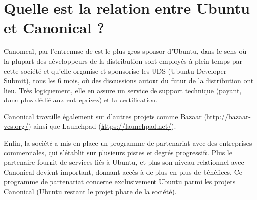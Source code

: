 \section{Quelle est la relation entre Ubuntu et Canonical ?}
Canonical, par l'entremise de  est le plus gros sponsor d'Ubuntu, dans le sens où la plupart des développeurs de la distribution sont employés à plein temps par cette société et qu'elle organise et sponsorise les UDS (Ubuntu Developer Submit), tous les 6 mois, où des discussions autour du futur de la distribution ont lieu. Très logiquement, elle en assure un service de support technique (payant, donc plus dédié aux entreprises) et la certification.\par
Canonical travaille également sur d'autres projets comme Bazaar (\url{http://bazaar-vcs.org/}) ainsi que Launchpad (\url{https://launchpad.net/}).\par
Enfin, la société a mis en place un programme de partenariat avec des entreprises commerciales, qui s'établit sur plusieurs pistes et degrés progressifs. Plus le partenaire fournit de services liés à Ubuntu, et plus son niveau relationnel avec Canonical devient important, donnant accès à de plus en plus de bénéfices. Ce programme de partenariat concerne exclusivement Ubuntu parmi les projets Canonical (Ubuntu restant le projet phare de la société).

